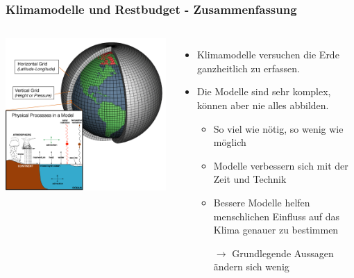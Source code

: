 \begin{frame}
	\frametitle{Klimamodelle und Restbudget - Zusammenfassung}

	\begin{columns}
      \includegraphics[width=0.9\linewidth]{bilder/AtmosphericModelSchematic.png}
      \begin{itemize}
        \item Klimamodelle versuchen die Erde ganzheitlich zu erfassen.
        \item Die Modelle sind sehr komplex, können aber nie alles abbilden.
        \begin{itemize}
          \item So viel wie nötig, so wenig wie möglich
          \item Modelle verbessern sich mit der Zeit und Technik
          \item Bessere Modelle helfen menschlichen Einfluss auf das Klima genauer zu bestimmen
          \item[$\rightarrow$] Grundlegende Aussagen ändern sich wenig
        \end{itemize}
      \end{itemize}
		\end{columns}


\end{frame}
